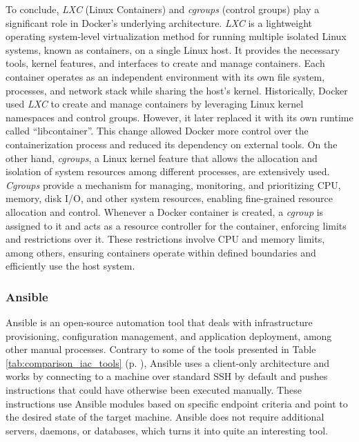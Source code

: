 To conclude, \textit{LXC} (Linux Containers) and \textit{cgroups} (control groups) play a significant role in Docker's underlying architecture. \textit{LXC} is a lightweight operating system-level virtualization method for running multiple isolated Linux systems, known as containers, on a single Linux host. It provides the necessary tools, kernel features, and interfaces to create and manage containers. Each container operates as an independent environment with its own file system, processes, and network stack while sharing the host's kernel. Historically, Docker used \textit{LXC} to create and manage containers by leveraging Linux kernel namespaces and control groups. However, it later replaced it with its own runtime called ``libcontainer''. This change allowed Docker more control over the containerization process and reduced its dependency on external tools.
On the other hand, \textit{cgroups}, a Linux kernel feature that allows the allocation and isolation of system resources among different processes, are extensively used. \textit{Cgroups} provide a mechanism for managing, monitoring, and prioritizing CPU, memory, disk I/O, and other system resources, enabling fine-grained resource allocation and control. Whenever a Docker container is created, a \textit{cgroup} is assigned to it and acts as a resource controller for the container, enforcing limits and restrictions over it. These restrictions involve CPU and memory limits, among others, ensuring containers operate within defined boundaries and efficiently use the host system.

\subsubsection{Ansible} \label{sec:selected_tools_ansible}

Ansible is an open-source automation tool that deals with infrastructure provisioning, configuration management, and application deployment, among other manual processes. Contrary to some of the tools presented in Table \ref{tab:comparison_iac_tools} (p. \pageref{tab:comparison_iac_tools}), Ansible uses a client-only architecture and works by connecting to a machine over standard SSH by default and pushes instructions that could have otherwise been executed manually. These instructions use Ansible modules based on specific endpoint criteria and point to the desired state of the target machine. Ansible does not require additional servers, daemons, or databases, which turns it into quite an interesting tool.

